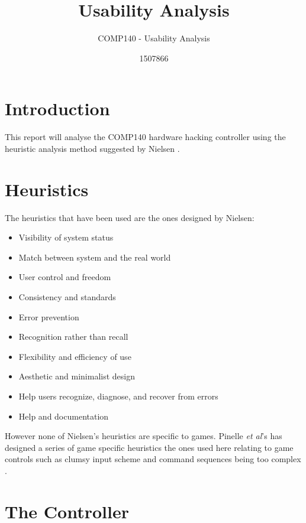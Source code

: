 \documentclass{scrartcl}
\title{Usability Analysis}
\subtitle{COMP140 - Usability Analysis}
\author{1507866}
\begin{document}
	
\maketitle


\section{Introduction}
This report will analyse the COMP140 hardware hacking controller using the heuristic analysis method suggested by Nielsen \cite{HeuristicEvaluation}.

\section{Heuristics}
The heuristics that have been used are the ones designed by Nielsen:

\begin{itemize}
	\item Visibility of system status
	\item Match between system and the real world
	\item User control and freedom	
	\item Consistency and standards
	\item Error prevention
	\item Recognition rather than recall
	\item Flexibility and efficiency of use
	\item Aesthetic and minimalist design
	\item Help users recognize, diagnose, and recover from errors	
	\item Help and documentation \cite{NNG}
\end{itemize}

However none of Nielsen's heuristics are specific to games. Pinelle \textit{et al}'s has designed a series of game specific heuristics the ones used here relating to game controls such as clumsy input scheme and command sequences being too complex \cite{Pinelle}.

\section{The Controller}
\end{document}
